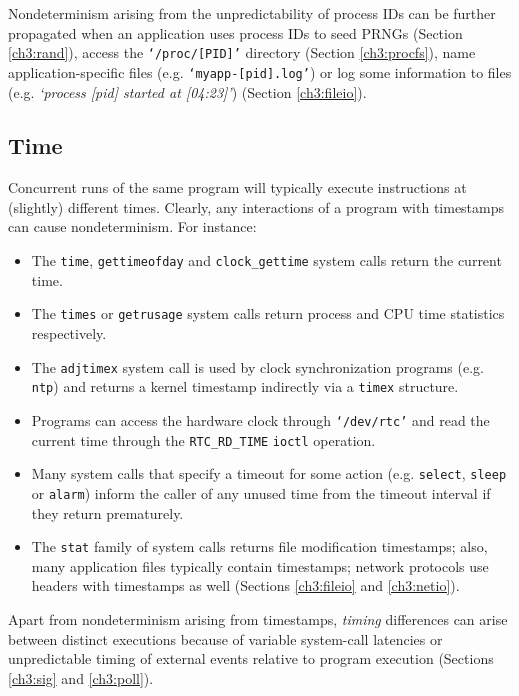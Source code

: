 \newpage 
Nondeterminism arising from the unpredictability of process IDs can be
further propagated when an application uses process IDs to seed PRNGs 
(Section \ref{ch3:rand}), access the \texttt{`/proc/[PID]'} directory
(Section \ref{ch3:procfs}), name application-specific files
(e.g. \texttt{`myapp-[pid].log'}) or log some information to files
(e.g. \emph{`process [pid] started at [04:23]'}) (Section \ref{ch3:fileio}). 

\subsection{Time} \label{ch3:time}
Concurrent runs of the same program will typically
execute instructions at (slightly) different times.
Clearly, any interactions of a program with timestamps
can cause nondeterminism. For instance:

\begin{itemize}
\item The \texttt{time}, \texttt{gettimeofday} and \texttt{clock\_gettime}
 system calls return the current time.
\item The \texttt{times} or \texttt{getrusage} system calls
return process and CPU time statistics respectively.
\item The \texttt{adjtimex} system call is used 
by clock synchronization programs (e.g. \texttt{ntp}) 
and returns a kernel timestamp indirectly via 
a \texttt{timex} structure.
\item Programs can access the hardware clock
through \texttt{`/dev/rtc'} and read the current time
through the \texttt{RTC\_RD\_TIME} \texttt{ioctl}
operation.
\item Many system calls that specify a timeout
for some action (e.g. \texttt{select}, \texttt{sleep} or \texttt{alarm})
inform the caller of any unused time from the timeout interval if they
return prematurely.
\item The \texttt{stat} family of system calls returns file
  modification timestamps; also, many application files typically contain timestamps;
  network protocols use headers with timestamps as well (Sections \ref{ch3:fileio}
  and \ref{ch3:netio}).
\end{itemize}

Apart from nondeterminism arising
from timestamps, {\em timing} differences
can arise between distinct executions 
because of variable system-call latencies 
or unpredictable timing of
external events relative
to program execution (Sections \ref{ch3:sig} and \ref{ch3:poll}).

